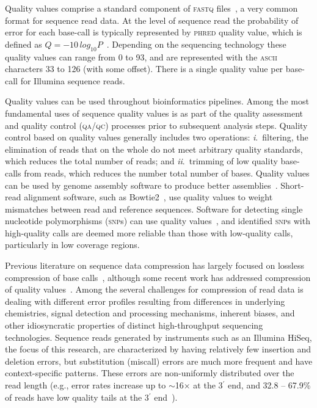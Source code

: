 Quality values comprise a standard component of \textsc{fastq}
files~\cite{Cock:2010ve}, a very common format for sequence read
data. At the level of sequence read the probability of error for each
base-call is typically represented by \textsc{phred} quality value,
which is defined as $Q =
-10\,log_{10}P$~\cite{Ewing:1998ly}. Depending on the sequencing
technology these quality values can range from 0 to 93, and are
represented with the \textsc{ascii} characters 33 to 126 (with some
offset). There is a single quality value per base-call for Illumina
sequence reads.

Quality values can be used throughout bioinformatics pipelines. Among
the most fundamental uses of sequence quality values is as part of the
quality assessment and quality control (\textsc{qa/qc}) processes
prior to subsequent analysis steps. Quality control based on quality
values generally includes two operations: \textit{i}.~filtering, the
elimination of reads that on the whole do not meet arbitrary quality
standards, which reduces the total number of reads; and
\textit{ii}.~trimming of low quality base-calls from reads, which
reduces the number total number of bases. Quality values can be used
by genome assembly software to produce better
assemblies~\cite[e.g.,][]{Bryant:2009uq,Gnerre:2011kx}. Short-read
alignment software, such as Bowtie2~\cite{Langmead:2012rw}, use
quality values to weight mismatches between read and reference
sequences. Software for detecting single nucleotide polymorphisms
(\textsc{snp}s) can use quality values~\cite[e.g.,][]{McKenna:2010bh},
and identified \textsc{snp}s with high-quality calls are deemed more
reliable than those with low-quality calls, particularly in low
coverage regions.

Previous literature on sequence data compression has largely focused
on lossless compression of base calls~\cite[reviewed
  in][]{Deorowicz:2013hq,Giancarlo:2014rw,Giancarlo:2009fk,
  Nalbantoglu:2010uq,Zhu:2013qr}, although some recent work has
addressed compression of quality
values~\cite[e.g.,][]{asnani2012lossy,Canovas:2014fr,Hach:2012ys,
  janin2013adaptive,Kozanitis:2011kl,Ochoa:2013rt,Tembe:2010ys,
  Wan:2012kq,DBLP:conf/recomb/YuYB14,zhou2014compression}. Among the
several challenges for compression of read data is dealing with
different error profiles resulting from differences in underlying
chemistries, signal detection and processing mechanisms, inherent
biases, and other idiosyncratic properties of distinct high-throughput
sequencing technologies. Sequence reads generated by instruments such
as an Illumina HiSeq, the focus of this research, are characterized by
having relatively few insertion and deletion errors, but substitution
(miscall) errors are much more frequent and have context-specific
patterns. These errors are non-uniformly distributed over the read
length (e.g., error rates increase up to $\sim$16$\times$ at the
3$^{\prime}$ end, and 32.8 -- 67.9\% of reads have low quality tails
at the 3$^{\prime}$ end~\cite{Minoche:2011km}).

